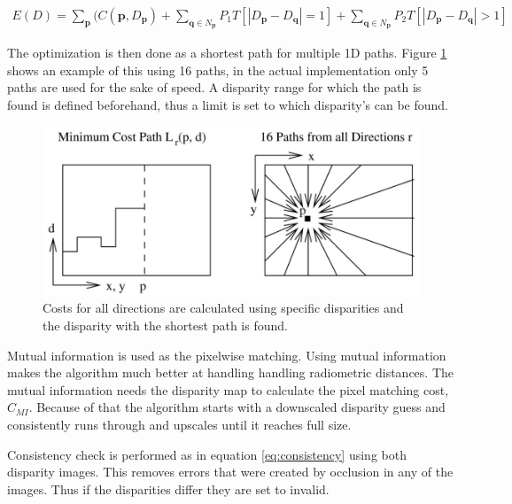 \begin{equation}\label{eq:cost}
\begin{split}
E(D) = \sum\limits_{\textbf{p}}(C(\textbf{p},D_{\textbf{p}}) + \sum\limits_{\textbf{q} \in N_{\textbf{p}} } P_{1} T [|D_{\textbf{p}} - D_{\textbf{q}}| = 1] + \sum\limits_{\textbf{q} \in N_{\textbf{p}} } P_{2} T [|D_{\textbf{p}} - D_{\textbf{q}}| > 1]
\end{split}
\end{equation} 

The optimization is then done as a shortest path for multiple 1D paths. Figure \ref{fig:paths} shows an example of this using 16 paths, in the actual implementation only 5 paths are used for the sake of speed. A disparity range for which the path is found is defined beforehand, thus a limit is set to which disparity’s can be found. 

\begin{figure}[h!]
  \centering
    \includegraphics[scale=0.2]{graphics/06_vision/cost_aggregation.jpg}
      \caption{Costs for all directions are calculated using specific disparities and the disparity with the shortest path is found.}
    \label{fig:paths}
\end{figure}

Mutual information \cite{egnal2000mutual} is used as the pixelwise matching. Using mutual information makes the algorithm much better at handling handling radiometric distances. The mutual information needs the disparity map to calculate the pixel matching cost, $ C_{MI} $. Because of that the algorithm starts with a downscaled disparity guess and consistently runs through and upscales until it reaches full size. 


Consistency check is performed as in equation \ref{eq:consistency} using both disparity images. This removes errors that were created by occlusion in any of the images. Thus if the disparities differ they are set to invalid. 

